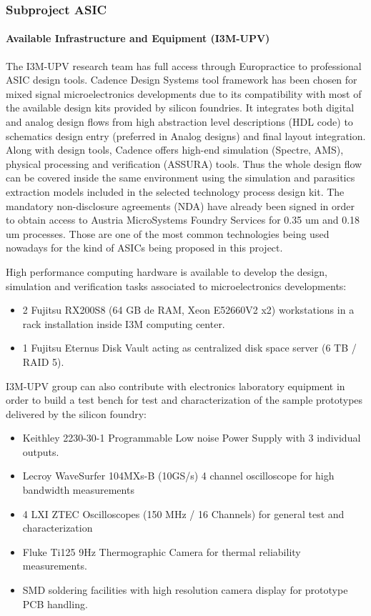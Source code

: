 \subsubsection*{Subproject ASIC}
\paragraph{Available Infrastructure and Equipment (I3M-UPV)}

The I3M-UPV research team has full access through Europractice to professional ASIC design tools. Cadence Design Systems tool framework has been chosen for mixed signal microelectronics developments due to its compatibility with most of the available design kits provided by silicon foundries. It integrates both digital and analog design flows from high abstraction level descriptions (HDL code) to schematics design entry (preferred in Analog designs) and final layout integration. Along with design tools, Cadence offers high-end simulation (Spectre, AMS), physical processing and verification (ASSURA) tools. Thus the whole design flow can be covered inside the same environment using the simulation and parasitics extraction models included in the selected technology process design kit. The mandatory non-disclosure agreements (NDA) have already been signed in order to obtain access to Austria MicroSystems Foundry Services for 0.35 um and 0.18 um processes. Those are one of the most common technologies being used nowadays for the kind of ASICs being proposed in this project.

\par High performance computing hardware is available to develop the design, simulation and verification tasks associated to microelectronics developments:
\begin{itemize}
 \item 2 Fujitsu RX200S8 (64 GB de RAM, Xeon E52660V2 x2) workstations in a rack installation inside I3M computing center.
 \item 1 Fujitsu Eternus Disk Vault acting as centralized disk space server (6 TB / RAID 5).
\end{itemize}

\par I3M-UPV group can also contribute with electronics laboratory equipment in order to build a test bench for test and characterization of the sample prototypes delivered by the silicon foundry:
\begin{itemize}
 \item Keithley 2230-30-1 Programmable Low noise Power Supply with 3 individual outputs.
 \item Lecroy WaveSurfer 104MXs-B (10GS/s) 4 channel oscilloscope for high bandwidth measurements
 \item 4 LXI ZTEC Oscilloscopes (150 MHz / 16 Channels) for general test and characterization
 \item Fluke Ti125 9Hz Thermographic Camera for thermal reliability measurements.
 \item SMD soldering facilities with high resolution camera display for prototype PCB handling.
\end{itemize}

